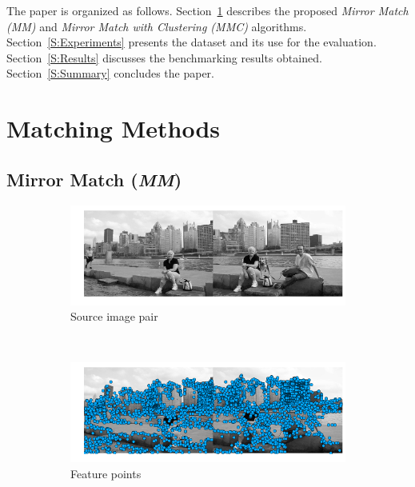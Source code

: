 \documentclass[conference]{IEEEtran}
\begin{document}
The paper is organized as follows.  Section~\ref{S:MatchingMethods} 
describes the proposed \emph{Mirror Match (MM)} and \emph{Mirror Match 
with Clustering (MMC)} algorithms.  Section~\ref{S:Experiments} presents 
the dataset and its use for the evaluation.  
Section~\ref{S:Results} discusses the benchmarking results obtained.  
Section~\ref{S:Summary} concludes the paper.  

\section{Matching Methods}
\label{S:MatchingMethods}
%
\subsection{Mirror Match (\emph{MM})}
%
\begin{figure}
	\centering%
        \begin{subfigure}[t]{\columnwidth}
			\centering
			\includegraphics[width=0.85\columnwidth]{images/MMC_pitts_source}
			\caption{Source image pair}
			\label{fig:pitts_source}
		\end{subfigure}%
		\\ %
        \begin{subfigure}[t]{\columnwidth}
			\centering
			\includegraphics[width=0.85\columnwidth]{images/MMC_pitts_keypoints}
			\caption{Feature points}
			\label{fig:pitts_keypoints}
		\end{subfigure}%
		\\ %
        \begin{subfigure}[t]{\columnwidth}

\end{subfigure}
\end{figure}
\end{document}
